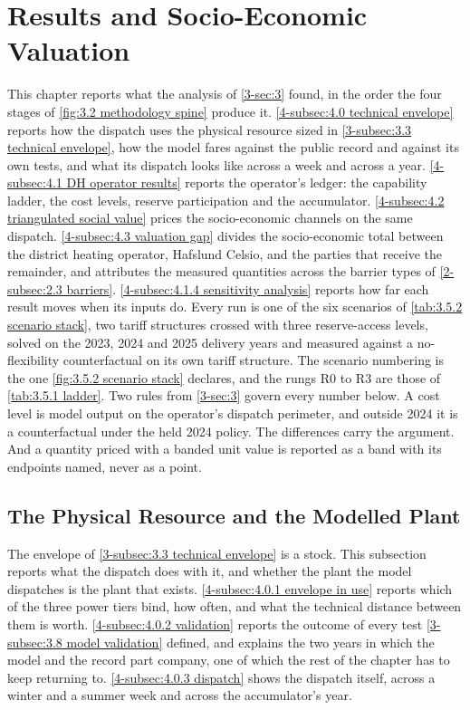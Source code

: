 \section{Results and Socio-Economic Valuation}
\label{4-sec:4 results}

This chapter reports what the analysis of \autoref{3-sec:3} found, in the order the four stages of \autoref{fig:3.2 methodology spine} produce it. \autoref{4-subsec:4.0 technical envelope} reports how the dispatch uses the physical resource sized in \autoref{3-subsec:3.3 technical envelope}, how the model fares against the public record and against its own tests, and what its dispatch looks like across a week and across a year. \autoref{4-subsec:4.1 DH operator results} reports the operator's ledger: the capability ladder, the cost levels, reserve participation and the accumulator. \autoref{4-subsec:4.2 triangulated social value} prices the socio-economic channels on the same dispatch. \autoref{4-subsec:4.3 valuation gap} divides the socio-economic total between the district heating operator, Hafslund Celsio, and the parties that receive the remainder, and attributes the measured quantities across the barrier types of \autoref{2-subsec:2.3 barriers}. \autoref{4-subsec:4.1.4 sensitivity analysis} reports how far each result moves when its inputs do. Every run is one of the six scenarios of \autoref{tab:3.5.2 scenario stack}, two tariff structures crossed with three reserve-access levels, solved on the 2023, 2024 and 2025 delivery years and measured against a no-flexibility counterfactual on its own tariff structure. The scenario numbering is the one \autoref{fig:3.5.2 scenario stack} declares, and the rungs R0 to R3 are those of \autoref{tab:3.5.1 ladder}. Two rules from \autoref{3-sec:3} govern every number below. A cost level is model output on the operator's dispatch perimeter, and outside 2024 it is a counterfactual under the held 2024 policy. The differences carry the argument. And a quantity priced with a banded unit value is reported as a band with its endpoints named, never as a point.

\subsection{The Physical Resource and the Modelled Plant}
\label{4-subsec:4.0 technical envelope}

The envelope of \autoref{3-subsec:3.3 technical envelope} is a stock. This subsection reports what the dispatch does with it, and whether the plant the model dispatches is the plant that exists. \autoref{4-subsec:4.0.1 envelope in use} reports which of the three power tiers bind, how often, and what the technical distance between them is worth. \autoref{4-subsec:4.0.2 validation} reports the outcome of every test \autoref{3-subsec:3.8 model validation} defined, and explains the two years in which the model and the record part company, one of which the rest of the chapter has to keep returning to. \autoref{4-subsec:4.0.3 dispatch} shows the dispatch itself, across a winter and a summer week and across the accumulator's year.

